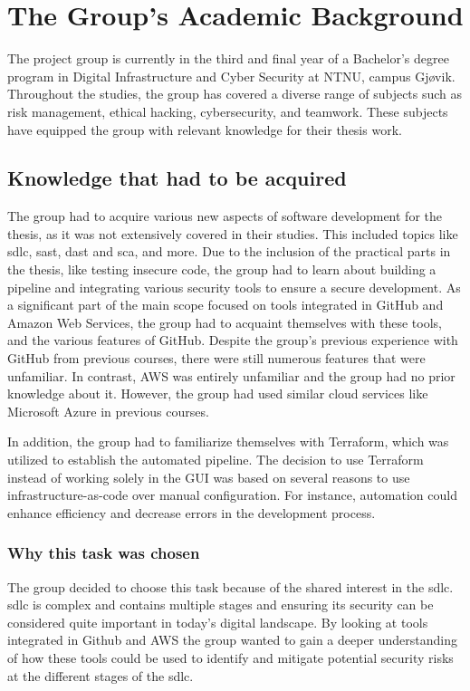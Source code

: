   

\section{The Group’s Academic Background}
The project group is currently in the third and final year of a Bachelor's degree program in Digital Infrastructure and Cyber Security at NTNU, campus Gjøvik. Throughout the studies, the group has covered a diverse range of subjects such as risk management, ethical hacking, cybersecurity, and teamwork. These subjects have equipped the group with relevant knowledge for their thesis work.

\subsection{Knowledge that had to be acquired}
\label{section: Knowledge that had to be acquired}
The group had to acquire various new aspects of software development for the thesis, as it was not extensively covered in their studies. This included topics like \acrshort{sdlc}, \acrlong{sast}, \acrlong{dast} and \acrlong{sca}, and more. Due to the inclusion of the practical parts in the thesis, like testing insecure code, the group had to learn about building a pipeline and integrating various security tools to ensure a secure development. As a significant part of the main scope focused on tools integrated in GitHub and Amazon Web Services, the group had to acquaint themselves with these tools, and the various features of GitHub. Despite the group's previous experience with GitHub from previous courses, there were still numerous features that were unfamiliar. In contrast, AWS was entirely unfamiliar and the group had no prior knowledge about it. However, the group had used similar cloud services like Microsoft Azure in previous courses.

In addition, the group had to familiarize themselves with Terraform, which was utilized to establish the automated pipeline. The decision to use Terraform instead of working solely in the GUI was based on several reasons to use infrastructure-as-code over manual configuration. For instance, automation could enhance efficiency and decrease errors in the development process.

\subsubsection{Why this task was chosen}
The group decided to choose this task because of the shared interest in the \acrlong{sdlc}. \acrshort{sdlc} is complex and contains multiple stages and ensuring its security can be considered quite important in today's digital landscape. By looking at tools integrated in Github and AWS the group wanted to gain a deeper understanding of how these tools could be used to identify and mitigate potential security risks at the different stages of the \acrshort{sdlc}.

